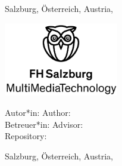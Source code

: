 \begin{titlepage}
{    \vfill
    
    Salzburg, \ifmmtlanguagegerman Österreich, \else Austria, \fi  \thesisdate
    }

\else %

    \begin{center}
    
    \includegraphics[width=5cm]{images/FHSLogo.jpg}


    \vspace*{4cm}
    
    \fontsize{20.79}{18pt}{\selectfont        
    	\textit{\textbf{\titlename}}
    }
    
    \vspace*{4cm}
    
    \fontsize{20.79}{18pt}{%
    \ifmmtlanguagegerman
      \textbf{ \ifmmtpaper Seminararbeit \else Bachelorarbeit \fi }
    \else
        \textbf{ \ifmmtpaper Seminararbeit \else Bachelor Thesis \fi }
    \fi
    }
    
    
    \end{center}
    
    \vfill
    
    \ifmmtlanguagegerman Autor*in: \else Author: \fi  \authorname  \\
    \ifmmtlanguagegerman Betreuer*in: \else Advisor: \fi \advisor \\
    Repository: \thesisrepo \\
    
    Salzburg, \ifmmtlanguagegerman Österreich, \else Austria, \fi \thesisdate
    
    
    

\fi

\end{titlepage}

